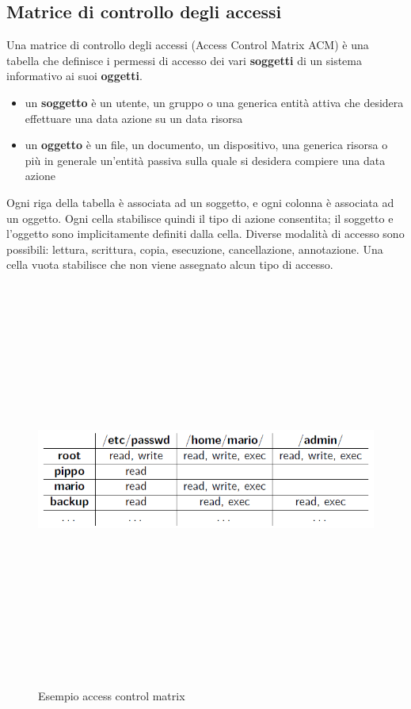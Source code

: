 \subsection{Matrice di controllo degli accessi} 
Una matrice di controllo degli accessi (Access Control Matrix ACM) è una tabella che definisce i permessi di accesso dei vari \textbf{soggetti} di un sistema informativo ai suoi \textbf{oggetti}.
\begin{itemize} 
  \item un \textbf{soggetto} è un utente, un gruppo o una generica entità attiva che desidera effettuare una data azione su un data risorsa
  \item un \textbf{oggetto} è un file, un documento, un dispositivo, una generica risorsa o più in generale un'entità passiva sulla quale si desidera compiere una data azione
\end{itemize}

Ogni riga della tabella è associata ad un soggetto, e ogni colonna è associata ad un oggetto. Ogni cella stabilisce quindi il tipo di azione consentita; il soggetto e l’oggetto sono implicitamente definiti dalla cella. Diverse modalità di accesso sono possibili: lettura, scrittura, copia,
esecuzione, cancellazione, annotazione. Una cella vuota stabilisce che non viene assegnato alcun tipo di accesso.
\begin{figure}[htbp]
	\centering%
	\subfigure%
	{\includegraphics[height=13cm, width=13cm, keepaspectratio]{Immagini/Capitolo1/access_control_matrix_ex.png}}
	\caption{Esempio access control matrix \label{fig:acm}} 	
\end{figure}

